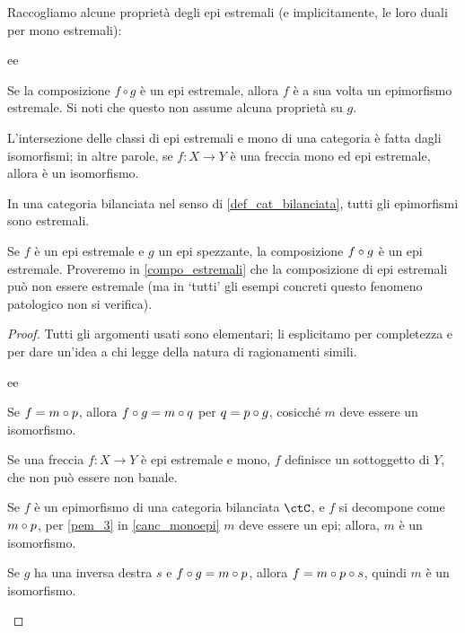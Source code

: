 \begin{proposition}
	Raccogliamo alcune proprietà degli epi estremali (e implicitamente, le loro duali per mono estremali):
	\begin{enumtag}{ee}
		\item \label{ee_1} Se la composizione \(f \circ g\) è un epi estremale, allora \(f\) è a sua volta un epimorfismo estremale. Si noti che questo non assume alcuna proprietà su \(g\).
		\item \label{ee_2} L'intersezione delle classi di epi estremali e mono di una categoria è fatta dagli isomorfismi; in altre parole, se \(f : X\to Y\) è una freccia mono ed epi estremale, allora è un isomorfismo.
		\item \label{ee_3} In una categoria bilanciata nel senso di \ref{def_cat_bilanciata}, tutti gli epimorfismi sono estremali.
		\item \label{ee_4} Se \(f\) è un epi estremale e \(g\) un epi spezzante, la composizione \(f\circ g\) è un epi estremale. Proveremo in \ref{compo_estremali} che la composizione di epi estremali può non essere estremale (ma in `tutti' gli esempi concreti questo fenomeno patologico non si verifica).
	\end{enumtag}
\end{proposition}
\begin{proof}
	Tutti gli argomenti usati sono elementari; li esplicitamo per completezza e per dare un'idea a chi legge della natura di ragionamenti simili.
	\begin{enumtag}{ee}
		\item Se \(f = m \circ p\), allora \(f\circ g = m\circ q\) per \(q = p\circ g\), cosicché \(m\) deve essere un isomorfismo.
		\item Se una freccia \(f : X\to Y\) è epi estremale e mono, \(f\) definisce un sottoggetto di \(Y\), che non può essere non banale.
		\item Se \(f\) è un epimorfismo di una categoria bilanciata \(\ctC\), e \(f\) si decompone come \(m\circ p\), per \ref{pem_3} in \ref{canc_monoepi} \(m\) deve essere un epi; allora, \(m\) è un isomorfismo.
		\item Se \(g\) ha una inversa destra \(s\) e \(f\circ g = m\circ p\), allora \(f = m\circ p\circ s\), quindi \(m\) è un isomorfismo.\qedhere
	\end{enumtag}
\end{proof}
